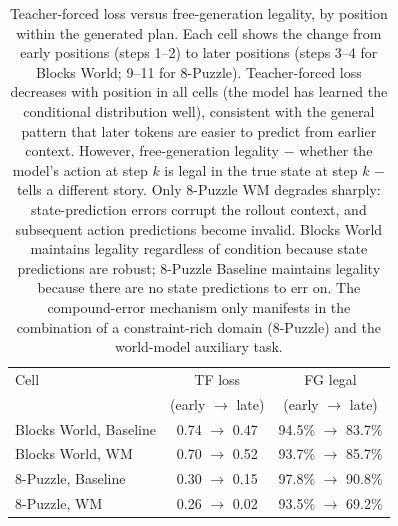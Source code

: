 \begin{table}[t]
\centering
\caption{Teacher-forced loss versus free-generation legality, by position within the generated plan. Each cell shows the change from early positions (steps 1--2) to later positions (steps 3--4 for Blocks World; 9--11 for 8-Puzzle). Teacher-forced loss decreases with position in all cells (the model has learned the conditional distribution well), consistent with the general pattern that later tokens are easier to predict from earlier context. However, free-generation legality $-$ whether the model's action at step $k$ is legal in the true state at step $k$ $-$ tells a different story. Only 8-Puzzle WM degrades sharply: state-prediction errors corrupt the rollout context, and subsequent action predictions become invalid. Blocks World maintains legality regardless of condition because state predictions are robust; 8-Puzzle Baseline maintains legality because there are no state predictions to err on. The compound-error mechanism only manifests in the combination of a constraint-rich domain (8-Puzzle) and the world-model auxiliary task.}
\label{tab:tf-vs-fg}
\begin{tabular}{lcc}
\toprule
Cell & TF loss & FG legal \\
     & (early $\to$ late) & (early $\to$ late) \\
\midrule
Blocks World, Baseline & 0.74 $\to$ 0.47 & 94.5\% $\to$ 83.7\% \\
Blocks World, WM & 0.70 $\to$ 0.52 & 93.7\% $\to$ 85.7\% \\
8-Puzzle, Baseline & 0.30 $\to$ 0.15 & 97.8\% $\to$ 90.8\% \\
8-Puzzle, WM & 0.26 $\to$ 0.02 & 93.5\% $\to$ 69.2\% \\
\bottomrule
\end{tabular}
\end{table}
